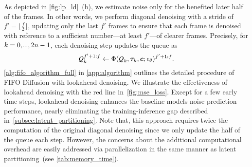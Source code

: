As depicted in \cref{fig:lp_ld}~(b), we estimate noise only for the benefited later half of the frames.
In other words, we perform diagonal denoising with a stride of $f' = \lfloor \frac{f}{2} \rfloor$, updating only the last $f'$ frames to ensure that each frame is denoised with reference to a sufficient number---at least $f'$---of clearer frames.
Precisely, for $k=0,\text{\mycdots},2n-1$, each denoising step updates the queue as
%
\begin{align} \label{eq:ld}
    \Q_k^{f'+1:f} \leftarrow \Phi(\Q_k,\bm{\tau}_k,\bm{c};\epsilon_\theta)^{f'+1:f}.
\end{align}
%
\cref{alg:fifo_algorithm_full} in \cref{app:algorithm} outlines the detailed procedure of FIFO-Diffusion with lookahead denoising.
We illustrate the effectiveness of lookahead denoising with the red line in~\cref{fig:mse_loss}.
Except for a few early time steps, lookahead denoising enhances the baseline models noise prediction performance, nearly eliminating the training-inference gap described in~\cref{subsec:latent_partitioning}.
Note that, this approach requires twice the computation of the original diagonal denoising since we only update the half of the queue each step.
However, the concerns about the additional computational overhead are easily addressed via parallelization in the same manner as latent partitioning~(see \cref{tab:memory_time}).

